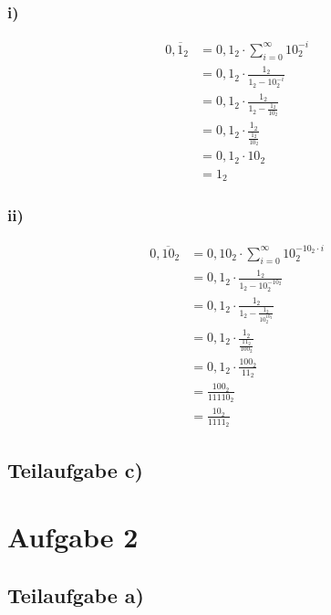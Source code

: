 \documentclass{llncs}
\begin{document}
\subsubsection*{i)}

\begin{align*}
0,\overline{1}_2 &= 0,1_2 \cdot \sum_{i=0}^{\infty} 10^{-i}_2 \\
               &= 0,1_2 \cdot \frac{1_2}{1_2-10^{-i}_2} \\
               &= 0,1_2 \cdot \frac{1_2}{1_2-\frac{1_2}{10_2}} \\
               &= 0,1_2 \cdot \frac{1_2}{\frac{1_2}{10_2}} \\
               &= 0,1_2 \cdot 10_2 \\
               &= 1_2
\end{align*}

\subsubsection*{ii)}

\begin{align*}
0,\overline{10}_2 &= 0,10_2 \cdot \sum_{i=0}^{\infty} 10^{-10_2 \cdot i}_2 \\
                  &= 0,1_2 \cdot \frac{1_2}{1_2-10^{-10_2}_2} \\
                  &= 0,1_2 \cdot \frac{1_2}{1_2-\frac{1_2}{10^{10_2}_2}} \\
                  &= 0,1_2 \cdot \frac{1_2}{\frac{11_2}{100_2}} \\
                  &= 0,1_2 \cdot \frac{100_2}{11_2} \\
                  &= \frac{100_2}{11110_2} \\
                  &= \frac{10_2}{1111_2}
\end{align*}


\subsection*{Teilaufgabe c)}

\section*{Aufgabe 2}
\subsection*{Teilaufgabe a)}
\end{document}

